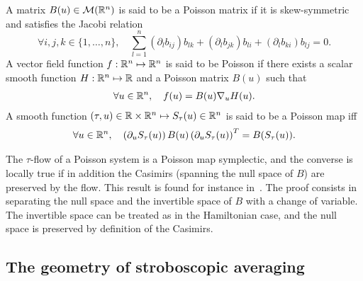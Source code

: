 \begin{definition}
  A matrix $B(u) \in {\cal M}(\mathbb{R}^{n})$ is said to be a Poisson matrix if
  it is skew-symmetric and satisfies the Jacobi relation
  $$
  \forall i,j,k \in \{1,\ldots,n\}, \quad \sum_{l=1}^n (\partial_l b_{ij}) b_{lk} +(\partial_l b_{jk}) b_{li}+(\partial_l b_{ki}) b_{lj} = 0. 
  $$
  A vector field function $f:\mathbb{R}^{n} \mapsto \mathbb{R}^{n}$ is said to be Poisson
  if there exists a scalar smooth function $H:\mathbb{R}^{n} \mapsto \mathbb{R}$ and a
  Poisson matrix $B(u)$ such that 
  \begin{align*}
    \forall u \in \mathbb{R}^{n}, \quad f(u) = B(u) \nabla_u H(u).
  \end{align*}
  A smooth function $(\tau,u) \in \mathbb{R} \times \mathbb{R}^{n} \mapsto  S_\tau(u) \in
  \mathbb{R}^{n}$ is said to be a Poisson map  iff
  \begin{align*}
    \forall u \in \mathbb{R}^{n}, \quad \left(\partial_u S_\tau(u)\right) B(u) \left(\partial_u S_\tau(u)\right)^T = B(S_\tau(u)).
  \end{align*}
\end{definition}

\begin{remark} \label{sec:geometry:rmk:equiv_poisson} The $\tau$-flow of a
  Poisson system is a Poisson map symplectic, and the converse is locally
  true if in addition the Casimirs (spanning the null space of $B$) are
  preserved by the flow. This result is found for instance in~\cite[Chap.
  VII, Thm. 4.5]{hairer.2006.geometric}. The proof consists in separating
  the null space and the invertible space of $B$ with a change of
  variable. The invertible space can be treated as in the Hamiltonian
  case, and the null space is preserved by definition of the Casimirs. 
\end{remark}



\subsection{The geometry of stroboscopic averaging}


